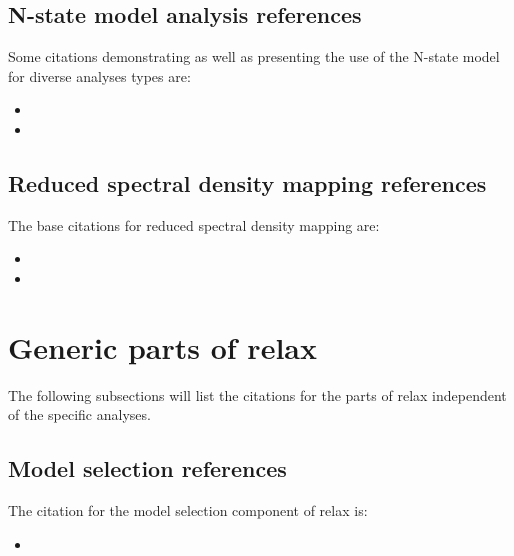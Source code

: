 
\subsection{N-state model analysis references}

Some citations demonstrating as well as presenting the use of the N-state model for diverse analyses types are:

\begin{itemize}
\item {}
\item {}
\end{itemize}



\subsection{Reduced spectral density mapping references}

The base citations for reduced spectral density mapping are:

\begin{itemize}
\item {}
\item {}
\end{itemize}




\section{Generic parts of relax}

The following subsections will list the citations for the parts of relax independent of the specific analyses.



\subsection{Model selection references}

The citation for the model selection component of relax is:

\begin{itemize}
\item {}
\end{itemize}


